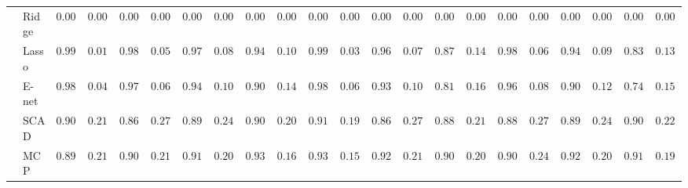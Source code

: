 \begin{tabular}{ll|ll|llllll|llllll|llllll}
	& Ridge  & $0.0000$ & $0.0000$ & $0.0000$ & $0.0000$ & $0.0000$ & $0.0000$ & $0.0000$ & $0.0000$ & $0.0000$ & $0.0000$ & $0.0000$ & $0.0000$ & $0.0000$ & $0.0000$ & $0.0000$ & $0.0000$ & $0.0000$ & $0.0000$ & $0.0000$ & $0.0000$ \\
	& Lasso  & $0.9983$ & $0.0167$ & $0.9850$ & $0.0535$ & $0.9733$ & $0.0811$ & $0.9467$ & $0.1056$ & $0.9917$ & $0.0365$ & $0.9683$ & $0.0738$ & $0.8717$ & $0.1457$ & $0.9800$ & $0.0682$ & $0.9467$ & $0.0914$ & $0.8300$ & $0.1381$ \\
	& E-net  & $0.9883$ & $0.0427$ & $0.9717$ & $0.0672$ & $0.9467$ & $0.1082$ & $0.9017$ & $0.1403$ & $0.9867$ & $0.0612$ & $0.9333$ & $0.1086$ & $0.8150$ & $0.1605$ & $0.9683$ & $0.0877$ & $0.9017$ & $0.1256$ & $0.7400$ & $0.1523$ \\
	& SCAD  & $0.9000$ & $0.2145$ & $0.8617$ & $0.2783$ & $0.8917$ & $0.2409$ & $0.9083$ & $0.2043$ & $0.9133$ & $0.1931$ & $0.8617$ & $0.2763$ & $0.8883$ & $0.2159$ & $0.8850$ & $0.2749$ & $0.8900$ & $0.2498$ & $0.9033$ & $0.2250$ \\
	& MCP  & $0.8983$ & $0.2144$ & $0.9083$ & $0.2176$ & $0.9133$ & $0.2017$ & $0.9317$ & $0.1626$ & $0.9350$ & $0.1533$ & $0.9250$ & $0.2137$ & $0.9050$ & $0.2096$ & $0.9000$ & $0.2404$ & $0.9200$ & $0.2044$ & $0.9133$ & $0.1946$ \\
	\hline 
\end{tabular}